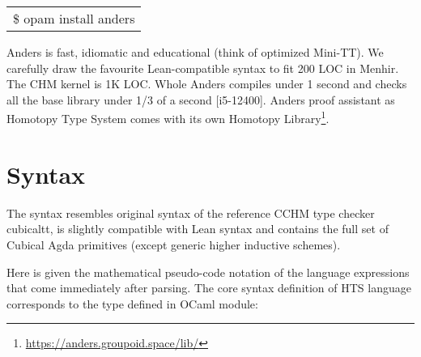\documentclass{article}
\theoremstyle{definition}
\begin{document}
\begin{table}[ht]
\centering
\begin{tabular}{l}
\$ opam install anders
\end{tabular}
\end{table}

Anders is fast, idiomatic and educational (think of optimized Mini-TT). We carefully draw the favourite Lean-compatible
syntax to fit 200 LOC in Menhir. The CHM kernel is 1K LOC. Whole Anders compiles under 1
second and checks all the base library under 1/3 of a second [i5-12400]. Anders proof assistant
as Homotopy Type System comes with its own Homotopy Library\footnote{\url{https://anders.groupoid.space/lib/}}.

\section{Syntax}

The syntax resembles original syntax of the reference CCHM type checker cubicaltt,
is slightly compatible with Lean syntax and contains the full set of Cubical Agda \cite{CubicalAgda}
primitives (except generic higher inductive schemes).

Here is given the mathematical pseudo-code notation of the language
expressions that come immediately after parsing. The core syntax definition of HTS language
corresponds to the type defined in OCaml module:
\end{document}
